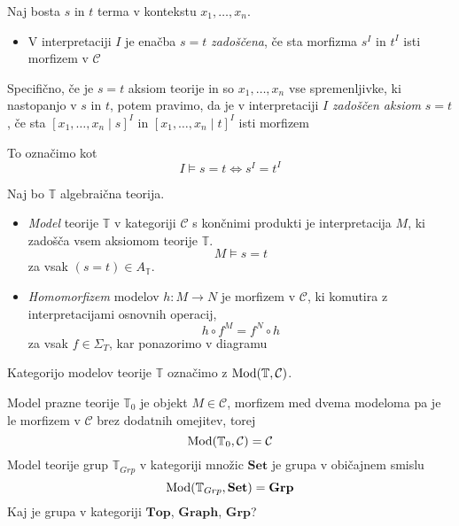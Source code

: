\begin{definicija}
Naj bosta $s$ in $t$ terma v kontekstu $x_1, \ldots, x_n$. 
\begin{itemize}
\item V interpretaciji $I$ je enačba $s = t$ \emph{zadoščena}, če sta morfizma $s^I$ in $t^I$ isti morfizem v $\mathcal{C}$
\end{itemize}
%
Specifično, če je $s = t$ aksiom teorije in so $x_1, \ldots, x_n$ vse spremenljivke, ki nastopanjo v $s$ in $t$, potem pravimo, da je v interpretaciji $I$ \emph{zadoščen aksiom} $s = t$, če sta $[x_1, \ldots, x_n \mid s]^I$ in $[x_1, \ldots, x_n \mid t]^I$ isti morfizem
\begin{center}
\end{center}
%
To označimo kot
$$I \models s = t \Longleftrightarrow s^I = t^I$$
\end{definicija}
%
\begin{definicija}
Naj bo $\mathbb{T}$ algebraična teorija. 
\begin{itemize}
%
\item \emph{Model} teorije $\mathbb{T}$ v kategoriji $\mathcal{C}$ s končnimi produkti je interpretacija $M$, ki zadošča vsem aksiomom teorije $\mathbb{T}$.
$$M \models s = t$$ za vsak $(s = t) \in A_\mathbb{T}$.
\end{itemize}
\end{definicija}
%
\begin{definicija}
\begin{itemize}
\item \emph{Homomorfizem} modelov $h : M \to N$ je morfizem v $\mathcal{C}$, ki komutira z interpretacijami osnovnih operacij,
$$h \circ f^M = f^N \circ h$$
za vsak $f \in \Sigma_T$, kar ponazorimo v diagramu
\begin{center}
\end{center}
\end{itemize}
\end{definicija}
%
Kategorijo modelov teorije $\mathbb{T}$ označimo z $\operatorname{Mod}(\mathbb{T}, \mathcal{C})$.
%
\begin{primer}
Model prazne teorije $\mathbb{T}_0$ je objekt $M \in \mathcal{C}$, morfizem med dvema modeloma pa je le morfizem v $\mathcal{C}$ brez dodatnih omejitev, torej
$$\operatorname{Mod}(\mathbb{T}_0, \mathcal{C}) = \mathcal{C}$$
%
Model teorije grup $\mathbb{T}_{Grp}$ v kategoriji množic $\mathbf{Set}$ je grupa v običajnem smislu
$$\operatorname{Mod}(\mathbb{T}_{Grp}, \mathbf{Set}) = \mathbf{Grp}$$
%
Kaj je grupa v kategoriji $\mathbf{Top}$, $\mathbf{Graph}$, $\mathbf{Grp}$?
\end{primer}
